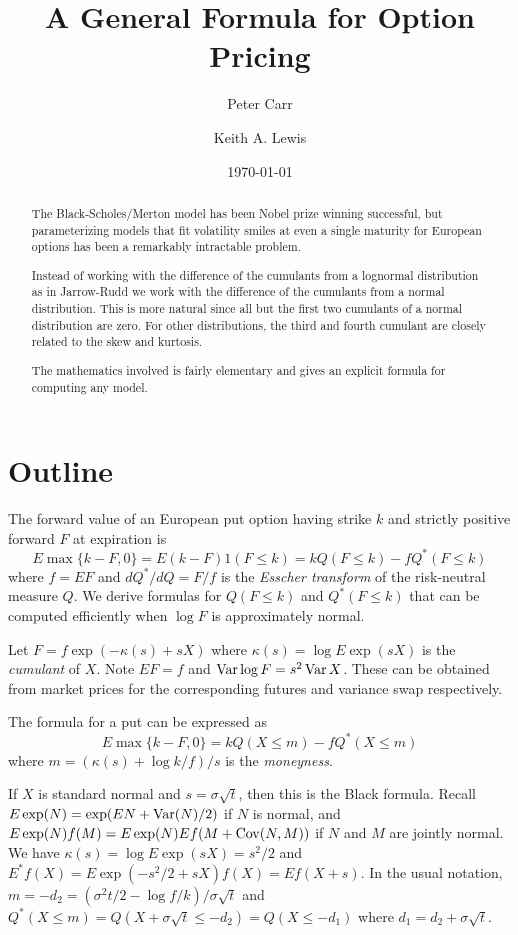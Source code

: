\documentclass[11pt]{article}
\title{A General Formula for Option Pricing}
\author[1]{Peter Carr}
\author[2]{Keith A. Lewis}
\affil[1]{NYU Tandon School of Engineering}
\affil[2]{KALX, LLC}
\date{\today}
\newcommand{\Var}{\mathop{\rm{Var}}}
\newcommand{\Cov}{\mathop{\rm{Cov}}}
\theoremstyle{definition}
\begin{document}
\maketitle
\begin{abstract}
The Black-Scholes/Merton model has been Nobel prize winning successful,
but parameterizing models that fit volatility smiles at even a single
maturity for European options has been a remarkably
intractable problem.

Instead of working with the difference of the cumulants from a lognormal
distribution as in Jarrow-Rudd \cite{JarRud1982} we work with the
difference of the cumulants from a normal distribution.  This is more
natural since all but the first two cumulants of a normal distribution
are zero. For other distributions, the third and fourth cumulant are closely
related to the skew and kurtosis.

The mathematics involved is fairly elementary and gives an
explicit formula for computing any model.
\end{abstract}

\section{Outline}
The forward value of an European put option having strike \(k\)
and strictly positive forward $F$ at expiration is
\[
E\max\{k - F, 0\} = E(k - F)1(F \le k) = kQ(F\le k) - fQ^*(F\le k)
\]
where $f = EF$ and $dQ^*/dQ = F/f$
is the {\em Esscher transform}\cite{Ess1932} of the risk-neutral
measure $Q$.
We derive formulas for
\(Q(F\le k)\) and \(Q^*(F\le k)\) that can be computed
efficiently when $\log F$ is approximately normal.

Let \(F = f\exp(-\kappa(s) + sX)\) where \(\kappa(s) = \log E \exp(sX)\)
is the {\em cumulant} of \(X\).  Note \(EF = f\) and \(\Var\log F =
s^2\Var X\). These can be obtained from market prices
for the corresponding futures and variance swap
respectively.

The formula for a put can be expressed as
\[
E\max\{k - F, 0\} = kQ(X\le m) - fQ^*(X\le m)
\]
where \(m = (\kappa(s) + \log k/f)/s\) is the {\em moneyness}.

If \(X\) is standard normal and \(s = \sigma\sqrt{t}\),
then this is the Black\cite{Bla1976} formula. Recall
\(
E\exp(N) = \exp(E N + \Var(N)/2)
\) 
if \(N\) is
normal, and 
\(
E \exp(N) f(M) = E\exp(N) Ef(M + \Cov(N,M))
\)
if \(N\) and \(M\) are jointly normal. We have
\(\kappa(s) = \log E\exp(sX) = s^2/2\) and
\(E^*f(X) = E\exp(-s^2/2 + sX) f(X)
= E f(X + s)\). In the usual notation,
\(m = -d_2 = (\sigma^2t/2 - \log f/k)/\sigma\sqrt{t}\)
and \(Q^*(X \le m) = Q(X + \sigma\sqrt{t} \le -d_2)
= Q(X \le -d_1)\) where \(d_1 = d_2 + \sigma\sqrt{t}\).
\end{document}
